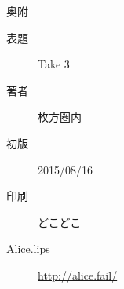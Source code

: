 
\vspace*{150mm}

\begin{itembox}{ 奥附 }
  \begin{description}
    \item[表題] Take 3
    \item[著者] 枚方圏内
    \item[初版] 2015/08/16
    \item[印刷] どこどこ
    \item[Alice.lips] \url{http://alice.fail/}
  \end{description}
\end{itembox}
